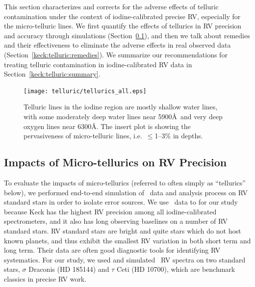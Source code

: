 This section characterizes and corrects for the adverse effects of
telluric contamination under the context of iodine-calibrated precise
RV, especially for the micro-telluric lines. We first quantify the
effects of tellurics in RV precision and accuracy through simulations
(Section~\ref{keck:telluric:impact}), and then we talk about remedies
and their effectiveness to eliminate the adverse effects in real
observed data (Section~\ref{keck:telluric:remedies}). We summarize our
recommendations for treating telluric contamination in
iodine-calibrated RV data in Section~\ref{keck:telluric:summary}.


\begin{figure}
\texttt{[image: telluric/tellurics\_all.eps]} 
\caption{Telluric lines in the iodine region are mostly shallow water
lines, with some moderately deep water lines near 5900\AA\ and very
deep oxygen lines near 6300\AA. The insert plot is showing the
pervasiveness of micro-telluric lines, i.e.~$\leq$1--3\% in depths.
\label{telluric:fig:telluric}}
\end{figure}



\subsection{Impacts of Micro-tellurics on RV Precision}\label{keck:telluric:impact}

To evaluate the impacts of micro-tellurics (referred to often simply
as ``tellurics'' below), we performed end-to-end simulation of \keck\
data and analysis process on RV standard stars in order to isolate
error sources. We use \keck\ data to for our study because Keck has
the highest RV precision among all iodine-calibrated spectrometers,
and it also has long observing baselines on a number of RV standard
stars. RV standard stars are bright and quite stars which do not host
known planets, and thus exhibit the smallest RV variation in both
short term and long term. Their data are often good diagnostic tools
for identifying RV systematics. For our study, we used and simulated
\keck\ RV spectra on two standard stars, $\sigma$ Draconis (HD 185144)
and $\tau$ Ceti (HD 10700), which are benchmark classics in precise RV
work.

